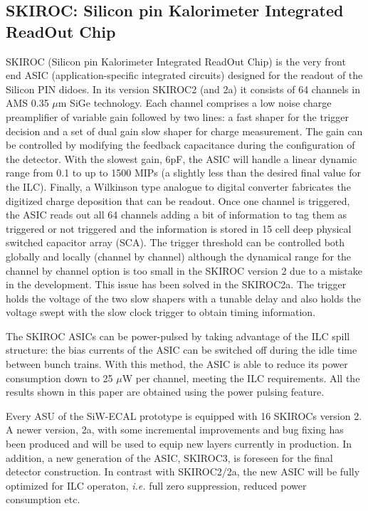 \documentclass[a4paper,11pt]{article}
\begin{document}
\subsection{SKIROC: Silicon pin Kalorimeter Integrated ReadOut Chip}
\label{sec:skiroc}

SKIROC\cite{Callier:2011zz} (Silicon pin Kalorimeter Integrated ReadOut Chip) is the very front end ASIC (application-specific integrated circuits)
designed for the readout of the Silicon PIN didoes.
In its version SKIROC2 (and 2a) it consists of 64 channels in AMS 0.35 $\mu$m SiGe technology.
Each channel comprises a low noise charge preamplifier of variable gain followed by two lines:
a fast shaper for the trigger decision and a set of dual gain slow shaper for charge measurement. 
The gain can be controlled by modifying the feedback capacitance during the configuration of the detector.
With the slowest gain, 6pF, the ASIC will handle a linear dynamic range from 0.1 to up to 1500 MIPs 
(a slightly less than the desired final value for the ILC). 
Finally, a Wilkinson type analogue to digital converter fabricates the digitized charge deposition that can be readout. 
Once one channel is triggered, the ASIC reads out all 64 channels adding a bit of information to tag them as
triggered or not triggered and the information is stored in 15 cell deep physical switched capacitor array (SCA).
The trigger threshold can be controlled both globally and locally (channel by channel) although the
dynamical range for the channel by channel option is too small in the SKIROC version 2 due to a mistake in the development. This issue has
been solved in the SKIROC2a. The trigger holds the voltage of the two slow shapers with a tunable delay and also
holds the voltage swept with the slow clock trigger to obtain timing information. 

The SKIROC ASICs can be power-pulsed by taking advantage of the ILC spill structure: 
the bias currents of the ASIC can be switched off during the idle time between bunch trains.
With this method, the ASIC is able to reduce its power consumption down to 25 $\mu$W per channel,
meeting the ILC requirements. All the results shown in this paper are obtained using the power pulsing feature.

Every ASU of the SiW-ECAL prototype is equipped with 16 SKIROCs version 2. A newer version, 2a, with some incremental improvements
and bug fixing has been produced and will be used to equip new layers currently in production.
In addition, a new generation of the ASIC, SKIROC3, is foreseen for the final detector construction.
In contrast with SKIROC2/2a, the new ASIC will be fully optimized for ILC operaton, {\it i.e.} full zero suppression, reduced power consumption etc.
\end{document}
